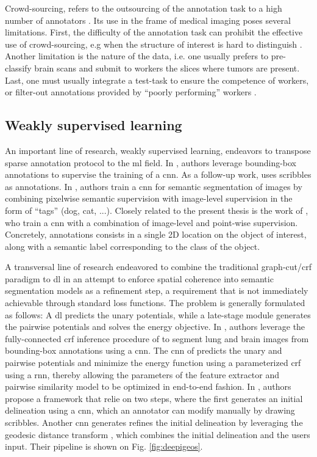 Crowd-sourcing, refers to the outsourcing of the annotation task to a high number of annotators \cite{orting19}.
Its use in the frame of medical imaging poses several limitations.
First, the difficulty of the annotation task can prohibit the effective use of crowd-sourcing, e.g when the structure of interest is hard to distinguish \cite{orting19}.
Another limitation is the nature of the data, i.e. one usually prefers to pre-classify brain scans and submit to workers the slices where tumors are present.
Last, one must usually integrate a test-task to ensure the competence of workers, or filter-out annotations provided by ``poorly performing'' workers \cite{park18}.

\subsection{Weakly supervised learning}
An important line of research, weakly supervised learning, endeavors to transpose sparse annotation protocol to the \gls{ml} field.
In \cite{dai15}, authors leverage bounding-box annotations to supervise the training of a \gls{cnn}.
As a follow-up work, \cite{lin16} uses scribbles as annotations.
In \cite{papandreou15}, authors train a \gls{cnn} for semantic segmentation of images by combining pixelwise semantic supervision with image-level supervision in the form of ``tags'' (dog, cat, ...).
Closely related to the present thesis is the work of \cite{bearman16}, who train a \gls{cnn} with a combination of image-level and point-wise supervision.
Concretely, annotations consists in a single 2D location on the object of interest, along with a semantic label corresponding to the class of the object.

A transversal line of research endeavored to combine the traditional graph-cut/\gls{crf} paradigm to \gls{dl} in an attempt to enforce spatial coherence into semantic segmentation models as a refinement step, a requirement that is not immediately achievable through standard loss functions.
The problem is generally formulated as follows: A \gls{dl} predicts the unary potentials, while a late-stage module generates the pairwise potentials and solves the energy objective.
In \cite{rajchl16}, authors leverage the fully-connected \gls{crf} inference procedure of \cite{krahenbuhl11} to segment lung and brain images from bounding-box annotations using a \gls{cnn}.
The \gls{cnn} of \cite{rajchl16} predicts the unary and pairwise potentials and minimize the energy function using a parameterized \gls{crf} using a \gls{rnn}, thereby allowing the parameters of the feature extractor and pairwise similarity model to be optimized in end-to-end fashion.
In \cite{wang18}, authors propose a framework that relie on two steps, where the first generates an initial delineation using a \gls{cnn}, which an annotator can modify manually by drawing scribbles.
Another \gls{cnn} generates refines the initial delineation by leveraging the geodesic distance transform \cite{criminisi08}, which combines the initial delineation and the users input.
Their pipeline is shown on Fig. \ref{fig:deepigeos}.

